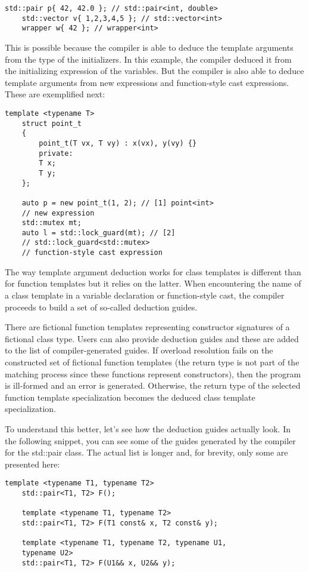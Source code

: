 \begin{lstlisting}[style=styleCXX]
	std::pair p{ 42, 42.0 }; // std::pair<int, double>
	std::vector v{ 1,2,3,4,5 }; // std::vector<int>
	wrapper w{ 42 }; // wrapper<int>
\end{lstlisting}

This is possible because the compiler is able to deduce the template arguments from the type of the initializers. In this example, the compiler deduced it from the initializing expression of the variables. But the compiler is also able to deduce template arguments from new expressions and function-style cast expressions. These are exemplified next:

\begin{lstlisting}[style=styleCXX]
	template <typename T>
	struct point_t
	{
		point_t(T vx, T vy) : x(vx), y(vy) {}
		private:
		T x;
		T y;
	};
	
	auto p = new point_t(1, 2); // [1] point<int>
	// new expression
	std::mutex mt;
	auto l = std::lock_guard(mt); // [2]
	// std::lock_guard<std::mutex>
	// function-style cast expression
\end{lstlisting}

The way template argument deduction works for class templates is different than for function templates but it relies on the latter. When encountering the name of a class template in a variable declaration or function-style cast, the compiler proceeds to build a set of so-called deduction guides.

There are fictional function templates representing constructor signatures of a fictional class type. Users can also provide deduction guides and these are added to the list of compiler-generated guides. If overload resolution fails on the constructed set of fictional function templates (the return type is not part of the matching process since these functions represent constructors), then the program is ill-formed and an error is generated. Otherwise, the return type of the selected function template specialization becomes the deduced class template specialization.

To understand this better, let’s see how the deduction guides actually look. In the following snippet, you can see some of the guides generated by the compiler for the std::pair class. The actual list is longer and, for brevity, only some are presented here:

\begin{lstlisting}[style=styleCXX]
	template <typename T1, typename T2>
	std::pair<T1, T2> F();
	
	template <typename T1, typename T2>
	std::pair<T1, T2> F(T1 const& x, T2 const& y);
	
	template <typename T1, typename T2, typename U1,
	typename U2>
	std::pair<T1, T2> F(U1&& x, U2&& y);
\end{lstlisting}

